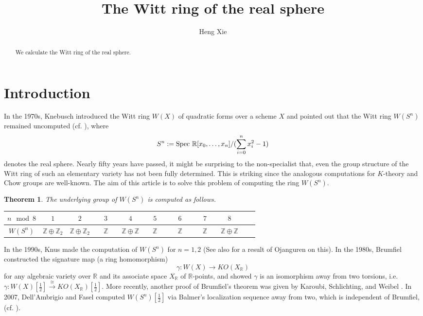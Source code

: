 \documentclass[psamsfonts]{amsart}
\title{The Witt ring of the real sphere}
\author{Heng Xie}
\theoremstyle{plain}
\newtheorem{theo}{Theorem}[section]
\theoremstyle{theorem}
\theoremstyle{definition}
\newcommand{\R}{\mathbb{R}}
\newcommand{\Spec}{\textnormal{Spec\,}}
\newcommand{\W}{W}
\begin{document}
	
	\begin{abstract}
We calculate the Witt ring of the real sphere.
	\end{abstract}
	
	\maketitle

	\raggedbottom
	\section{Introduction}
 
 In the 1970s, 	Knebusch introduced the Witt ring $\W(X)$ of quadratic forms over a scheme $X$ and pointed out that the Witt ring $\W(S^n)$ remained uncomputed (cf. \cite[p.\ 105]{Kne77}), where  
	\[S^n:=  \Spec\, \mathbb{R}[x_0, \ldots, x_n]/(\sum_{i=0}^n x_i^2 -1) \]
	denotes the real sphere. Nearly fifty years have passed, it might be surprising to the non-specialist that, even the group structure of the Witt ring of such an elementary variety has not been fully determined. This is striking since the analogous computations for $K$-theory and Chow groups are well-known. The aim of this article is to solve this problem of computing the ring $\W(S^n)$. 
	
	\begin{theo}\label{thm:main}\label{thm:main}  
		The underlying group of $\W(S^n)$ is computed as follows. 
\begin{table}[htbp]
\Small 
	\centering
	\renewcommand{\arraystretch}{1.2}
	\begin{tabular}{|c|c|c|c|c|c|c|c|c|c|c|}
		\hline
		$n \mod 8$ & $1$ & $2$ & $3$ & $4$ & $5$ & $6$ & $7$ & $8$ \\
		\hline \hline
		$\W(S^n)$ & $\mathbb{Z} \oplus \mathbb{Z}_2$ & $\mathbb{Z} \oplus \mathbb{Z}_2$ & $ \quad \mathbb{Z} \quad $  & $\mathbb{Z} \oplus \mathbb{Z} $ & $ \quad \mathbb{Z} \quad $ & $ \quad \mathbb{Z} \quad $ & $ \quad \mathbb{Z} \quad $ & $\mathbb{Z} \oplus \mathbb{Z}$ \\
		\hline
	\end{tabular}
\end{table}
	\end{theo}
		In the 1990s, Knus \cite{Knus} made the computation of $\W(S^n)$ for $n=1,2$ (See also \cite[Example 1.2.6]{Ba05} for a result of Ojanguren on this).  In the 1980s, Brumfiel \cite{Brumfiel} constructed the signature map (a ring homomorphism)
			  \[ \gamma: \W(X) \to KO(X_\R)\]
			  for any algebraic variety over $\mathbb{R}$ and its associate space $X_\R$ of $\R$-points, and showed $\gamma$ is an isomorphism away from two torsions, i.e. $\gamma: \W(X)[\frac{1}{2}] \xrightarrow{\cong} KO(X_\R)[\frac{1}{2}]$. More recently, another proof of Brumfiel's theorem was given by Karoubi, Schlichting, and Weibel \cite{KSW16}. In 2007, Dell'Ambrigio and Fasel computed $\W(S^n)[\frac{1}{2}]$ via Balmer's localization sequence away from two, which is independent of Brumfiel, (cf. \cite{DF08}). 
			 
\end{document}
